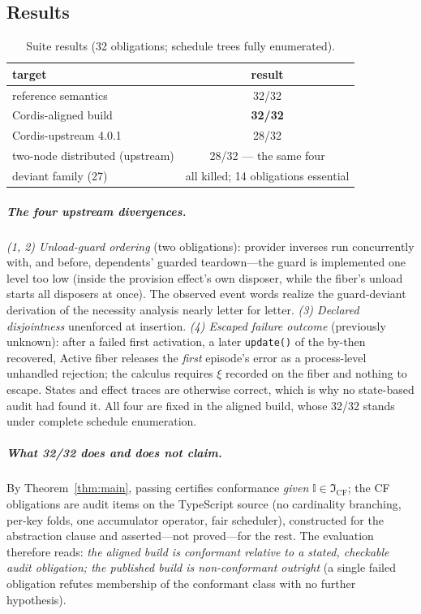 \documentclass[sigplan,screen,review,nonacm]{acmart}
\newcommand{\Impl}{\ensuremath{\mathbb I}}
\newcommand{\CF}{\ensuremath{\mathfrak I_{\mathrm{CF}}}}
\begin{document}
\subsection{Results}

\begin{table}[t]
\caption{Suite results (32 obligations; schedule trees fully enumerated).}
\label{tab:results}
\centering
\small
\begin{tabular}{lc}
\toprule
target & result \\
\midrule
reference semantics & 32/32 \\
Cordis-aligned build & \textbf{32/32} \\
Cordis-upstream 4.0.1 & 28/32 \\
two-node distributed (upstream) & 28/32 --- the same four \\
\midrule
deviant family (27) & all killed; 14 obligations essential \\
\bottomrule
\end{tabular}
\end{table}

\subparagraph{The four upstream divergences.}
\emph{(1, 2) Unload-guard ordering} (two obligations): provider inverses run
concurrently with, and before, dependents' guarded teardown---the guard is
implemented one level too low (inside the provision effect's own disposer,
while the fiber's unload starts all disposers at once). The observed event
words realize the guard-deviant derivation of the necessity analysis nearly
letter for letter. \emph{(3) Declared disjointness} unenforced at insertion.
\emph{(4) Escaped failure outcome} (previously unknown): after a failed first
activation, a later \texttt{update()} of the by-then recovered, Active fiber
releases the \emph{first} episode's error as a process-level unhandled
rejection; the calculus requires $\xi$ recorded on the fiber and nothing to
escape. States and effect traces are otherwise correct, which is why no
state-based audit had found it. All four are fixed in the aligned build, whose
32/32 stands under complete schedule enumeration.

\subparagraph{What 32/32 does and does not claim.} By
Theorem~\ref{thm:main}, passing certifies conformance \emph{given}
$\Impl \in \CF$; the CF obligations are audit items on the TypeScript source
(no cardinality branching, per-key folds, one accumulator operator, fair
scheduler), constructed for the abstraction clause and asserted---not
proved---for the rest. The evaluation therefore reads: \emph{the aligned build
is conformant relative to a stated, checkable audit obligation; the published
build is non-conformant outright} (a single failed obligation refutes
membership of the conformant class with no further hypothesis).
\end{document}
